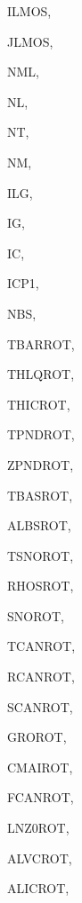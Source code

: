 {\begin{DoxyParamCaption}
\item[{integer, dimension (ilg)}]{I\+L\+M\+O\+S, }
\item[{integer, dimension (ilg)}]{J\+L\+M\+O\+S, }
\item[{integer}]{N\+M\+L, }
\item[{integer}]{N\+L, }
\item[{integer}]{N\+T, }
\item[{integer}]{N\+M, }
\item[{integer}]{I\+L\+G, }
\item[{integer}]{I\+G, }
\item[{integer}]{I\+C, }
\item[{integer}]{I\+C\+P1, }
\item[{integer}]{N\+B\+S, }
\item[{real, dimension(nl,nt,ig)}]{T\+B\+A\+R\+R\+O\+T, }
\item[{real, dimension(nl,nt,ig)}]{T\+H\+L\+Q\+R\+O\+T, }
\item[{real, dimension(nl,nt,ig)}]{T\+H\+I\+C\+R\+O\+T, }
\item[{real, dimension(nl,nt)}]{T\+P\+N\+D\+R\+O\+T, }
\item[{real, dimension(nl,nt)}]{Z\+P\+N\+D\+R\+O\+T, }
\item[{real, dimension(nl,nt)}]{T\+B\+A\+S\+R\+O\+T, }
\item[{real, dimension(nl,nm)}]{A\+L\+B\+S\+R\+O\+T, }
\item[{real, dimension(nl,nm)}]{T\+S\+N\+O\+R\+O\+T, }
\item[{real, dimension(nl,nm)}]{R\+H\+O\+S\+R\+O\+T, }
\item[{real, dimension (nl,nm)}]{S\+N\+O\+R\+O\+T, }
\item[{real, dimension(nl,nt)}]{T\+C\+A\+N\+R\+O\+T, }
\item[{real, dimension(nl,nt)}]{R\+C\+A\+N\+R\+O\+T, }
\item[{real, dimension(nl,nt)}]{S\+C\+A\+N\+R\+O\+T, }
\item[{real, dimension (nl,nt)}]{G\+R\+O\+R\+O\+T, }
\item[{real, dimension(nl,nt)}]{C\+M\+A\+I\+R\+O\+T, }
\item[{real, dimension(nl,nt,icp1)}]{F\+C\+A\+N\+R\+O\+T, }
\item[{real, dimension(nl,nt,icp1)}]{L\+N\+Z0\+R\+O\+T, }
\item[{real, dimension(nl,nt,icp1)}]{A\+L\+V\+C\+R\+O\+T, }
\item[{real, dimension(nl,nt,icp1)}]{A\+L\+I\+C\+R\+O\+T, }

\end{DoxyParamCaption}}
